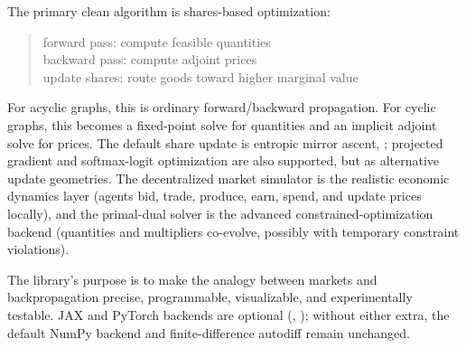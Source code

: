 The primary clean algorithm is shares-based optimization:
\begin{quote}
forward pass: compute feasible quantities \\
backward pass: compute adjoint prices \\
update shares: route goods toward higher marginal value
\end{quote}
For acyclic graphs, this is ordinary forward/backward propagation. For cyclic graphs, this
becomes a fixed-point solve for quantities and an implicit adjoint solve for prices. The
default share update is entropic mirror ascent,
; projected gradient
and softmax-logit optimization are also supported, but as alternative update geometries. The
decentralized market simulator is the realistic economic dynamics layer (agents bid, trade,
produce, earn, spend, and update prices locally), and the primal-dual solver is the advanced
constrained-optimization backend (quantities and multipliers co-evolve, possibly with
temporary constraint violations).

The library's purpose is to make the analogy between markets and backpropagation precise,
programmable, visualizable, and experimentally testable. JAX and PyTorch backends are
optional (, ); without either extra, the
default NumPy backend and finite-difference autodiff remain unchanged.


